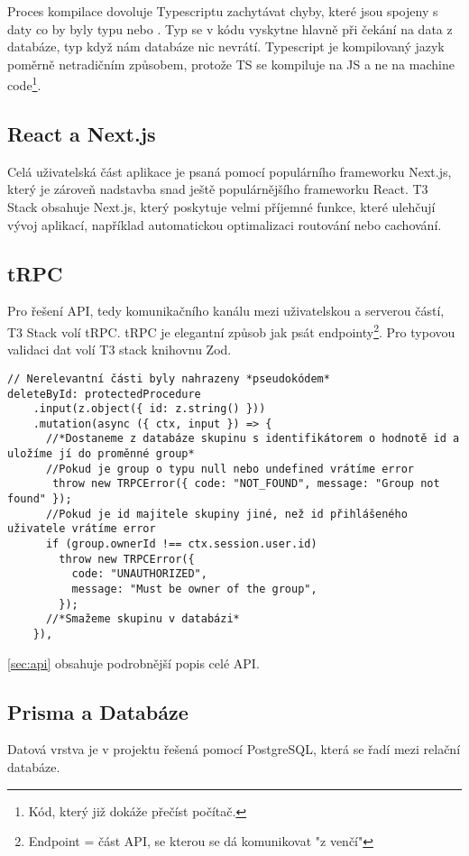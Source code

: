 Proces kompilace dovoluje Typescriptu zachytávat chyby, které jsou spojeny s daty co by byly typu  nebo . Typ  se v kódu vyskytne hlavně při čekání na data z databáze, typ  když nám databáze nic nevrátí.
Typescript je kompilovaný jazyk poměrně netradičním způsobem, protože TS se kompiluje na JS a ne na machine code\footnote{Kód, který již dokáže přečíst počítač.}.

\subsection{React a Next.js}

Celá uživatelská část aplikace je psaná pomocí populárního frameworku Next.js, který je zároveň nadstavba snad ještě populárnějšího frameworku React. T3 Stack obsahuje Next.js, který poskytuje velmi příjemné funkce, které ulehčují vývoj aplikací, například automatickou optimalizaci routování nebo cachování\cite{vercel}.

\subsection{tRPC}
Pro řešení API, tedy komunikačního kanálu mezi uživatelskou a serverou částí, T3 Stack volí tRPC. tRPC je elegantní způsob jak psát endpointy\footnote{Endpoint = část API, se kterou se dá komunikovat "z venčí"}. Pro typovou validaci dat volí T3 stack knihovnu Zod\cite{zod}.
\begin{lstlisting}[caption={Úryvek z "groups" routeru zobrazující mazání skupiny}]
// Nerelevantní části byly nahrazeny *pseudokódem*
deleteById: protectedProcedure
    .input(z.object({ id: z.string() }))
    .mutation(async ({ ctx, input }) => {
      //*Dostaneme z databáze skupinu s identifikátorem o hodnotě id a uložíme jí do proměnné group*
      //Pokud je group o typu null nebo undefined vrátíme error
       throw new TRPCError({ code: "NOT_FOUND", message: "Group not found" });
      //Pokud je id majitele skupiny jiné, než id přihlášeného uživatele vrátíme error
      if (group.ownerId !== ctx.session.user.id)
        throw new TRPCError({
          code: "UNAUTHORIZED",
          message: "Must be owner of the group",
        });
      //*Smažeme skupinu v databázi*
    }),
\end{lstlisting}
\autoref{sec:api} obsahuje podrobnější popis celé API.

\subsection{Prisma a Databáze}
Datová vrstva je v projektu řešená pomocí PostgreSQL, která se řadí mezi relační databáze.

